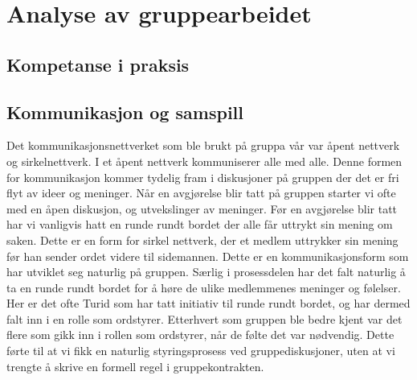
\chapter{Analyse av gruppearbeidet}

\section{Kompetanse i praksis}

\section{Kommunikasjon og samspill}
Det kommunikasjonsnettverket som ble brukt på gruppa vår var åpent nettverk og sirkelnettverk. I et åpent nettverk kommuniserer alle med alle. Denne formen for kommunikasjon kommer tydelig fram i diskusjoner på gruppen der det er fri flyt av ideer og meninger. Når en avgjørelse blir tatt på gruppen starter vi ofte med en åpen diskusjon, og utvekslinger av meninger. Før en avgjørelse blir tatt har vi vanligvis hatt en runde rundt bordet der alle får uttrykt sin mening om saken. Dette er en form for sirkel nettverk, der et medlem uttrykker sin mening før han sender ordet videre til sidemannen. Dette er en kommunikasjonsform som har utviklet seg naturlig på gruppen. Særlig i prosessdelen har det falt naturlig å ta en runde rundt bordet for å høre de ulike medlemmenes meninger og følelser. Her er det ofte Turid som har tatt initiativ til runde rundt bordet, og har dermed falt inn i en rolle som ordstyrer. Etterhvert som gruppen ble bedre kjent var det flere som gikk inn i rollen som ordstyrer, når de følte det var nødvendig. Dette førte til at vi fikk en naturlig styringsprosess ved gruppediskusjoner, uten at vi trengte å skrive en formell regel i gruppekontrakten.\\

